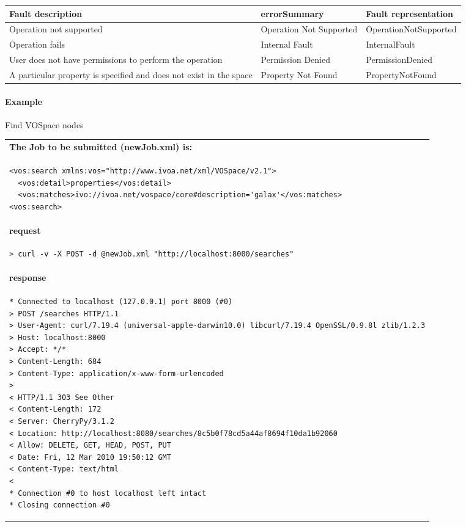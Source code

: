 \documentclass[11pt,a4paper]{ivoa}
\begin{document}
\vspace{3mm}
\begin{tabular}{ p{5cm} l p{4cm} }
\textbf{Fault description} & \textbf{errorSummary} & \textbf{Fault representation} \\
\hline
Operation not supported & Operation Not Supported & OperationNotSupported \\
\hline
Operation fails & Internal Fault & InternalFault \\
\hline
User does not have permissions to perform the operation	 & Permission Denied & PermissionDenied \\
\hline
A particular property is specified and does not exist in the space & Property Not Found & PropertyNotFound \\
\hline
\end{tabular}
\vspace{3mm}

\paragraph{Example}
Find VOSpace nodes

\begin{tabular}{ p{10cm} }
\\
\textbf{The Job to be submitted (newJob.xml) is:} \\
\begin{lstlisting}
<vos:search xmlns:vos="http://www.ivoa.net/xml/VOSpace/v2.1">
  <vos:detail>properties</vos:detail>
  <vos:matches>ivo://ivoa.net/vospace/core#description='galax'</vos:matches>
<vos:search>
\end{lstlisting} \\
\textbf{request} \\
\begin{lstlisting}
> curl -v -X POST -d @newJob.xml "http://localhost:8000/searches"
\end{lstlisting} \\
\textbf{response} \\
\begin{lstlisting}
* Connected to localhost (127.0.0.1) port 8000 (#0)
> POST /searches HTTP/1.1
> User-Agent: curl/7.19.4 (universal-apple-darwin10.0) libcurl/7.19.4 OpenSSL/0.9.8l zlib/1.2.3
> Host: localhost:8000
> Accept: */*
> Content-Length: 684
> Content-Type: application/x-www-form-urlencoded
> 
< HTTP/1.1 303 See Other
< Content-Length: 172
< Server: CherryPy/3.1.2
< Location: http://localhost:8080/searches/8c5b0f78cd5a44af8694f10da1b92060
< Allow: DELETE, GET, HEAD, POST, PUT
< Date: Fri, 12 Mar 2010 19:50:12 GMT
< Content-Type: text/html
< 
* Connection #0 to host localhost left intact
* Closing connection #0
\end{lstlisting} \\
\end{tabular}
\end{document}
